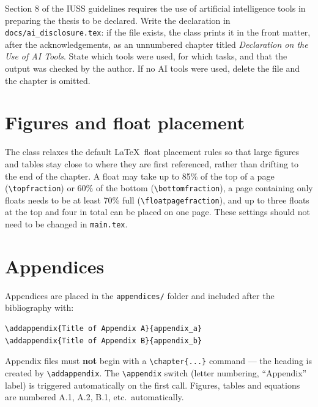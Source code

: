 Section 8 of the IUSS guidelines requires the use of artificial intelligence tools in preparing the thesis to be declared. Write the declaration in \texttt{docs/ai\_disclosure.tex}: if the file exists, the class prints it in the front matter, after the acknowledgements, as an unnumbered chapter titled \emph{Declaration on the Use of AI Tools}. State which tools were used, for which tasks, and that the output was checked by the author. If no AI tools were used, delete the file and the chapter is omitted.


\section{Figures and float placement}

The class relaxes the default \LaTeX\ float placement rules so that large figures and tables stay close to where they are first referenced, rather than drifting to the end of the chapter. A float may take up to 85\% of the top of a page (\verb|\topfraction|) or 60\% of the bottom (\verb|\bottomfraction|), a page containing only floats needs to be at least 70\% full (\verb|\floatpagefraction|), and up to three floats at the top and four in total can be placed on one page. These settings should not need to be changed in \texttt{main.tex}.


\section{Appendices}

Appendices are placed in the \texttt{appendices/} folder and included after the bibliography with:

\begin{verbatim}
\addappendix{Title of Appendix A}{appendix_a}
\addappendix{Title of Appendix B}{appendix_b}
\end{verbatim}

Appendix files must \textbf{not} begin with a \verb|\chapter{...}| command — the heading is created by \verb|\addappendix|. The \verb|\appendix| switch (letter numbering, ``Appendix'' label) is triggered automatically on the first call. Figures, tables and equations are numbered A.1, A.2, B.1, etc.\ automatically.

